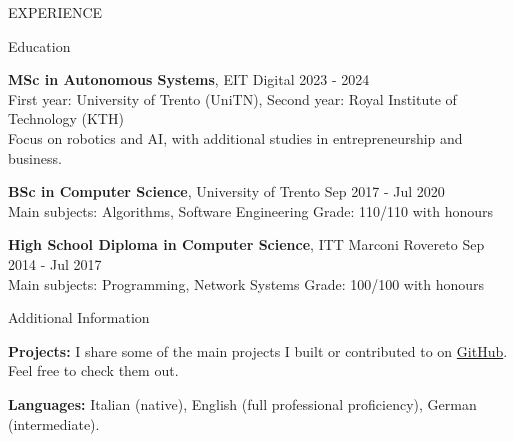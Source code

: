 \documentclass{resume} %
\begin{document}
\begin{rSection}{EXPERIENCE}

\end{rSection} 


\begin{rSection}{Education}


{\bf MSc in Autonomous Systems}, EIT Digital \hfill {2023 - 2024}\\
First year: University of Trento (UniTN), Second year: Royal Institute of Technology (KTH) \\
Focus on robotics and AI, with additional studies in entrepreneurship and business.

{\bf BSc in Computer Science}, University of Trento \hfill {Sep 2017 - Jul 2020} \\
Main subjects: Algorithms, Software Engineering  \quad Grade: 110/110 with honours

{\bf High School Diploma in Computer Science}, ITT Marconi Rovereto \hfill {Sep 2014 - Jul 2017} \\
Main subjects: Programming, Network Systems \quad Grade: 100/100 with honours

\end{rSection}

\begin{rSection}{Additional Information}

\textbf{Projects:} I share some of the main projects I built or contributed to on \href{https://github.com/riccardoperiotto}{GitHub}. Feel free to check them out.

\textbf{Languages:} Italian (native), English (full professional proficiency), German (intermediate).


\end{rSection}
\end{document}
